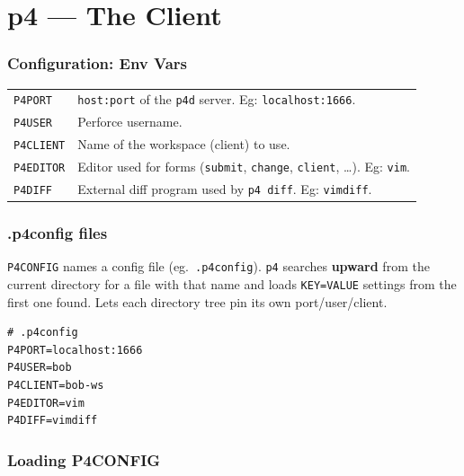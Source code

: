 \section{p4 --- The Client}

\subsubsection*{Configuration: Env Vars}

\begin{tabularx}{\linewidth}{lX}
    \texttt{P4PORT}     & \texttt{host:port} of the \texttt{p4d}
                            server. Eg: \texttt{localhost:1666}.\\
    \texttt{P4USER}     & Perforce username.\\
    \texttt{P4CLIENT}   & Name of the workspace (client) to use.\\
    \texttt{P4EDITOR}   & Editor used for forms (\texttt{submit},
                            \texttt{change}, \texttt{client},
                            \ldots). Eg: \texttt{vim}.\\
    \texttt{P4DIFF}     & External diff program used by
                            \texttt{p4 diff}. Eg:
                            \texttt{vimdiff}.\\
\hline
\end{tabularx}


\subsubsection*{.p4config files}

\texttt{P4CONFIG} names a config file (eg.\ \texttt{.p4config}).
\texttt{p4} searches \textbf{upward} from the current directory for
a file with that name and loads \texttt{KEY=VALUE} settings from the
first one found. Lets each directory tree pin its own
port/user/client.

\begin{mdframed}[backgroundcolor=gray!10,linecolor=Firebrick4]
\begin{verbatim}
# .p4config
P4PORT=localhost:1666
P4USER=bob
P4CLIENT=bob-ws
P4EDITOR=vim
P4DIFF=vimdiff
\end{verbatim}
\end{mdframed}


\subsubsection*{Loading P4CONFIG}


